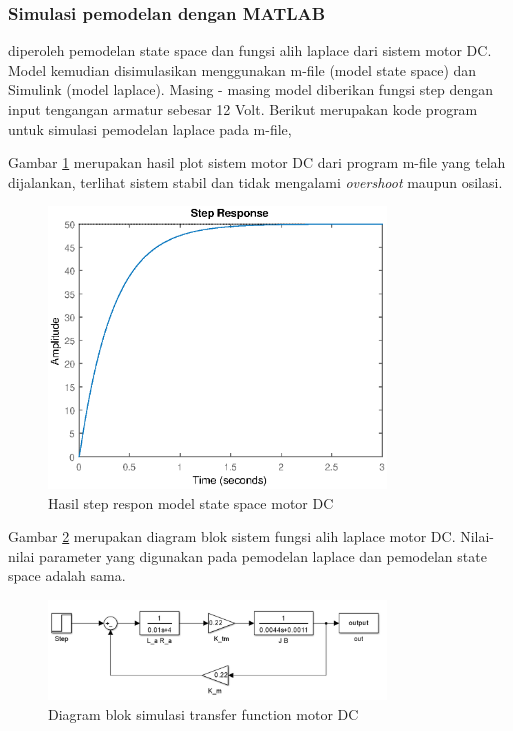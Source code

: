 \documentclass[../cover.tex]{subfiles}
\begin{document}
        \subsubsection{Simulasi pemodelan dengan MATLAB}
            diperoleh pemodelan state space dan fungsi alih laplace dari sistem motor DC. Model kemudian disimulasikan menggunakan m-file (model state space) dan Simulink (model laplace). Masing - masing model diberikan fungsi step dengan input tengangan armatur sebesar 12 Volt. Berikut merupakan kode program untuk simulasi pemodelan laplace pada m-file,
            \newline
            
            Gambar \ref{gambar_7} merupakan hasil plot sistem motor DC dari program m-file yang telah dijalankan, terlihat sistem stabil dan tidak mengalami \textit{overshoot} maupun osilasi.
            \begin{figure}[H]
                \centering
                \includegraphics[width = 0.8\textwidth]{assets/image/STATE_SPACE_MOTOR_DC.eps}
                \caption{Hasil step respon model state space motor DC}
                \label{gambar_7}
            \end{figure}
            Gambar \ref{gambar_8} merupakan diagram blok sistem fungsi alih laplace motor DC. Nilai-nilai parameter yang digunakan pada pemodelan laplace dan pemodelan state space adalah sama. 
            \begin{figure}[H]
                \centering
                \includegraphics[width = 0.8\textwidth]{assets/image/SIMULINK.png}
                \caption{Diagram blok simulasi transfer function motor DC}
                \label{gambar_8}
            \end{figure}
\end{document}

